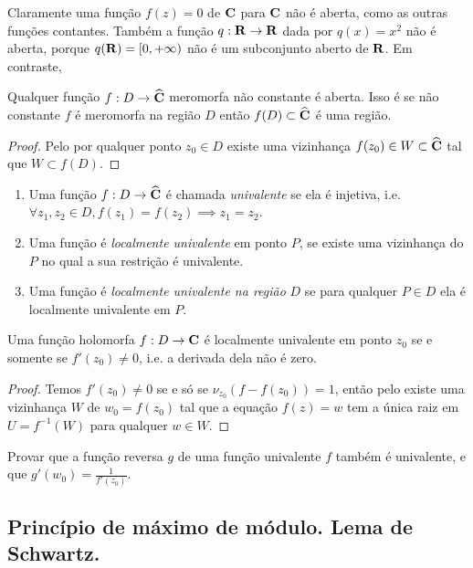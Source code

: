 Claramente uma função $f(z) = 0$ de $\mathbf{C}$ para $\mathbf{C}$ não é aberta, como as outras funções contantes.
Também a função $q: \mathbf{R} \to \mathbf{R}$ dada por $q(x) = x^2$ não é aberta,
porque $q(\mathbf{R}) = [0,+\infty)$ não é um subconjunto aberto de $\mathbf{R}$.
Em contraste,
\begin{teorema}
Qualquer função $f: D\to \widehat{\mathbf{C}}$ meromorfa não constante é aberta.
Isso é se não constante $f$ é meromorfa na região $D$ então $f(D) \subset \widehat{\mathbf{C}}$ é uma região.
\end{teorema}
\begin{proof}
Pelo  por qualquer ponto $z_0\in D$ existe uma vizinhança $f(z_0) \in W \subset \widehat{\mathbf{C}}$
tal que $W\subset f(D)$.
\end{proof}

\begin{defin}
\begin{enumerate}
\item Uma função $f: D\to\widehat{\mathbf{C}}$ é chamada \emph{univalente} se ela é injetiva, i.e.
$\forall z_1,z_2\in D, f(z_1) = f(z_2) \implies z_1 = z_2$.
\item Uma função é \emph{localmente univalente} em ponto $P$, se existe uma vizinhança
do $P$ no qual a sua restrição é univalente.
\item Uma função é \emph{localmente univalente na região} $D$ se para qualquer $P\in D$
ela é localmente univalente em $P$.
\end{enumerate}
\end{defin}

\begin{teorema}
\label{t:univalencia}
Uma função holomorfa $f : D\to \mathbf{C}$ é localmente univalente em ponto $z_0$ se e somente se 
$f'(z_0)\neq 0$, i.e. a derivada dela não é zero.
\end{teorema}
\begin{proof}
Temos $f'(z_0)\neq 0$ se e só se $\nu_{z_0}(f-f(z_0)) = 1$,
então pelo  existe uma vizinhança $W$ de $w_0 = f(z_0)$
tal que a equação $f(z) = w$ tem a única raiz em $U = f^{-1}(W)$
para qualquer $w\in W$.
\end{proof}

\begin{problema}
Provar que a função reversa $g$ de uma função univalente $f$ também é univalente,
e que $g'(w_0) = \frac{1}{f'(z_0)}$.
\end{problema}

\subsection{Princípio de máximo de módulo. Lema de Schwartz.}

